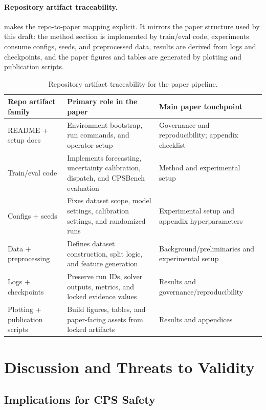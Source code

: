 \documentclass[11pt,a4paper,twocolumn]{article}
\begin{document}
\paragraph{Repository artifact traceability.}
 makes the repo-to-paper mapping explicit. It mirrors the paper structure used by this draft: the method section is implemented by train/eval code, experiments consume configs, seeds, and preprocessed data, results are derived from logs and checkpoints, and the paper figures and tables are generated by plotting and publication scripts.

\begin{table}[htbp]
\centering\small
\caption{Repository artifact traceability for the paper pipeline.}
\label{tab:repo_traceability}
\begin{tabular}{p{3.1cm}p{4.2cm}p{5.8cm}}
\toprule
Repo artifact family & Primary role in the paper & Main paper touchpoint \\
\midrule
README + setup docs & Environment bootstrap, run commands, and operator setup & Governance and reproducibility; appendix checklist \\
Train/eval code & Implements forecasting, uncertainty calibration, dispatch, and CPSBench evaluation & Method and experimental setup \\
Configs + seeds & Fixes dataset scope, model settings, calibration settings, and randomized runs & Experimental setup and appendix hyperparameters \\
Data + preprocessing & Defines dataset construction, split logic, and feature generation & Background/preliminaries and experimental setup \\
Logs + checkpoints & Preserve run IDs, solver outputs, metrics, and locked evidence values & Results and governance/reproducibility \\
Plotting + publication scripts & Build figures, tables, and paper-facing assets from locked artifacts & Results and appendices \\
\bottomrule
\end{tabular}
\end{table}

\section{Discussion and Threats to Validity}\label{sec:discussion}

\subsection{Implications for CPS Safety}
\end{document}
